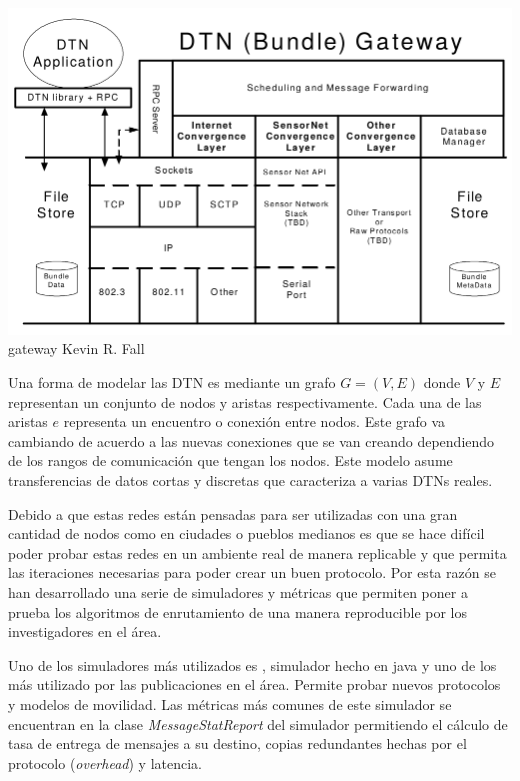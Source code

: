 {\includegraphics[scale=0.3]{imagenes/dtn/arquitectural_protcolo.png}}{gateway}
{Kevin R. Fall \cite{fall_delay-tolerant_2003}}


Una forma de modelar las DTN es mediante un grafo \cite{rapid} $G = (V, E)$
donde $V$ y $E$ representan un conjunto de nodos y aristas respectivamente.
Cada una de las aristas $e$ representa un encuentro o conexión entre nodos. Este
grafo va cambiando de acuerdo a las nuevas conexiones que se van creando
dependiendo de los rangos de comunicación que tengan los nodos. Este modelo
asume transferencias de datos cortas y discretas que caracteriza a varias DTNs
reales.




Debido a que estas redes están pensadas para ser utilizadas con una gran
cantidad de nodos como en ciudades o pueblos medianos es que se hace difícil
poder probar estas redes en un ambiente real de manera replicable y que permita
las iteraciones necesarias para poder crear un buen protocolo. Por esta
razón se han desarrollado una serie de simuladores y métricas que permiten poner
a prueba los algoritmos de enrutamiento de una manera reproducible por los
investigadores en el área.

Uno de los simuladores más utilizados es \theone{} \cite{keranen_one_2009},
simulador hecho en java y uno de los más utilizado por las publicaciones en el
área. Permite probar nuevos protocolos y modelos de movilidad. Las métricas más
comunes de este simulador se encuentran en la clase \textit{MessageStatReport}
del simulador permitiendo el cálculo de tasa de entrega de mensajes a su
destino, copias redundantes hechas por el protocolo (\textit{overhead}) y
latencia.

